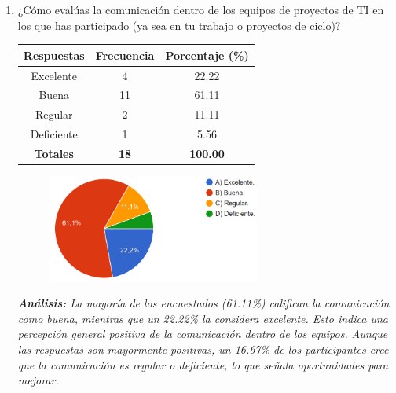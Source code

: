 \documentclass[journal]{IEEEtran}
\begin{document}
\begin{enumerate}
{}\\
	\item ¿Cómo evalúas la comunicación dentro de los equipos de proyectos de TI en los que has participado (ya sea en tu trabajo o proyectos de ciclo)?
	\begin{table}[H]
		\renewcommand{\arraystretch}{1.3}
		\centering
		\begin{tabular}{|c|c|c|}
			\hline
			\textbf{Respuestas} & \textbf{Frecuencia} & \textbf{Porcentaje (\%)}\\
			\hline
			Excelente & 4 & 22.22 \\
			Buena & 11 & 61.11 \\
			Regular & 2 & 11.11\\
			Deficiente & 1 & 5.56\\
			\hline
			\textbf{Totales} &\textbf{18}& \textbf{100.00}\\
			\hline
		\end{tabular}
	\end{table}
	\begin{figure}[h]
		\centering
		\includegraphics[width=07cm]{Pregunta13}
	\end{figure}
	\textit{\textbf{Análisis:} La mayoría de los encuestados (61.11\%) califican la comunicación como buena, mientras que un 22.22\% la considera excelente. Esto indica una percepción general positiva de la comunicación dentro de los equipos. Aunque las respuestas son mayormente positivas, un 16.67\% de los participantes cree que la comunicación es regular o deficiente, lo que señala oportunidades para mejorar.}\\
	

\end{enumerate}
\end{document}
